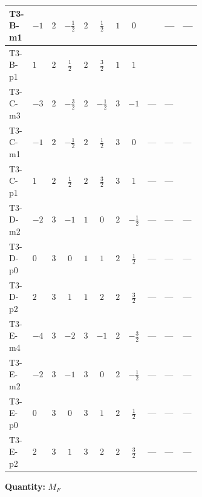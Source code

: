 \documentclass[8pt]{article}
\begin{document}
\begin{landscape}
\begin{longtable}{@{}llcccccc >{\raggedright\arraybackslash}p{0.21\linewidth} >{\raggedright\arraybackslash}p{0.21\linewidth} >{\raggedright\arraybackslash}p{0.21\linewidth}@{}}
\midrule
T3-B-m1 & $-1$ & $2$ & $-\frac{1}{2}$ & $2$ & $\frac{1}{2}$ & $1$ & $0$ & \scriptsize\adjustbox{max width=\linewidth}{$\begin{gathered} +\left(\left({y_1}\right)^{T}\,\left({y_1}\right)^{*}\,{M_F}\right)_{ij}\end{gathered}$} & --- & --- \\
\midrule
T3-B-p1 & $1$ & $2$ & $\frac{1}{2}$ & $2$ & $\frac{3}{2}$ & $1$ & $1$ & \scriptsize\adjustbox{max width=\linewidth}{$\begin{gathered} \left(\left({y_1}\right)^{T}\,\left({y_1}\right)^{*}\,{M_F}\right)_{ij}\end{gathered}$} & \scriptsize\adjustbox{max width=\linewidth}{$\begin{gathered} +\left({M_F}\,\left({y_2}\right)^{\dagger}\,{y_2}\right)_{ij}\end{gathered}$} & \scriptsize\adjustbox{max width=\linewidth}{$\begin{gathered} -6 {g_1}^2 \left({M_F}\right)_{ij}\end{gathered}$} \\
\midrule
T3-C-m3 & $-3$ & $2$ & $-\frac{3}{2}$ & $2$ & $-\frac{1}{2}$ & $3$ & $-1$ & --- & --- & \scriptsize\adjustbox{max width=\linewidth}{$\begin{gathered} -6 {g_1}^2 \left({M_F}\right)_{ij}\end{gathered}$} \\
\midrule
T3-C-m1 & $-1$ & $2$ & $-\frac{1}{2}$ & $2$ & $\frac{1}{2}$ & $3$ & $0$ & --- & --- & --- \\
\midrule
T3-C-p1 & $1$ & $2$ & $\frac{1}{2}$ & $2$ & $\frac{3}{2}$ & $3$ & $1$ & --- & --- & \scriptsize\adjustbox{max width=\linewidth}{$\begin{gathered} -6 {g_1}^2 \left({M_F}\right)_{ij}\end{gathered}$} \\
\midrule
T3-D-m2 & $-2$ & $3$ & $-1$ & $1$ & $0$ & $2$ & $-\frac{1}{2}$ & --- & --- & --- \\
\midrule
T3-D-p0 & $0$ & $3$ & $0$ & $1$ & $1$ & $2$ & $\frac{1}{2}$ & --- & --- & --- \\
\midrule
T3-D-p2 & $2$ & $3$ & $1$ & $1$ & $2$ & $2$ & $\frac{3}{2}$ & --- & --- & --- \\
\midrule
T3-E-m4 & $-4$ & $3$ & $-2$ & $3$ & $-1$ & $2$ & $-\frac{3}{2}$ & --- & --- & --- \\
\midrule
T3-E-m2 & $-2$ & $3$ & $-1$ & $3$ & $0$ & $2$ & $-\frac{1}{2}$ & --- & --- & --- \\
\midrule
T3-E-p0 & $0$ & $3$ & $0$ & $3$ & $1$ & $2$ & $\frac{1}{2}$ & --- & --- & --- \\
\midrule
T3-E-p2 & $2$ & $3$ & $1$ & $3$ & $2$ & $2$ & $\frac{3}{2}$ & --- & --- & --- \\
\midrule
\bottomrule
\end{longtable}
\clearpage
\noindent\textbf{Quantity: }$M_F$\par\smallskip

\end{landscape}
\end{document}
